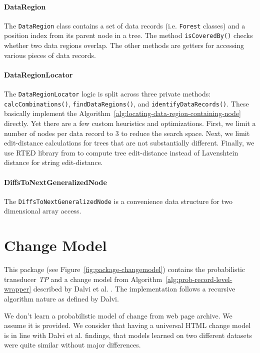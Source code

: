 
\paragraph{DataRegion} The \texttt{DataRegion} class contains a set of data records (i.e. \texttt{Forest} classes) and a position index from its parent node in a tree. The method \texttt{isCoveredBy()} checks whether two data regions overlap. The other methods are getters for accessing various pieces of data records.

\paragraph{DataRegionLocator} The \texttt{DataRegionLocator} logic is split across three private methods: \texttt{calcCombinations()}, \texttt{findDataRegions()}, and \texttt{identifyDataRecords()}. These basically implement the Algorithm~\ref{alg:locating-data-region-containing-node} directly. Yet there are a few custom heuristics and optimizations. First, we limit a number of nodes per data record to 3 to reduce the search space. Next, we limit edit-distance calculations for trees that are not substantially different. Finally, we use RTED library from \cite{pawlik2011a} to compute tree edit-distance instead of Lavenshtein distance for string edit-distance.

\paragraph{DiffsToNextGeneralizedNode} The \texttt{DiffsToNextGeneralizedNode} is a convenience data structure for two dimensional array access.


\section{Change Model}

This package (see Figure~\ref{fig:package-changemodel}) contains the probabilistic transducer \emph{TP} and a change model from Algorithm~\ref{alg:prob-record-level-wrapper} described by Dalvi et al. \cite{dalvi2009a}. The implementation follows a recursive algorithm nature as defined by Dalvi. 

We don't learn a probabilistic model of change from web page archive. We assume it is provided. We consider that having a universal HTML change model is in line with Dalvi et al. \cite{dalvi2009a} findings, that models learned on two different datasets were quite similar without major differences.

